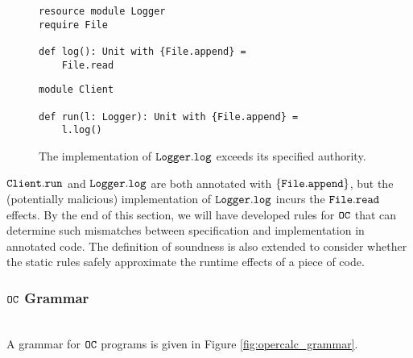 \begin{figure}[h]
\vspace{-5pt}

\begin{lstlisting}
resource module Logger
require File

def log(): Unit with {File.append} =
    File.read
\end{lstlisting}

\begin{lstlisting}
module Client

def run(l: Logger): Unit with {File.append} =
    l.log()
\end{lstlisting}

\vspace{-7pt}
\caption{The implementation of $\mathtt{Logger.log}$ exceeds its specified authority.}
\label{fig:opercalc_motivating}
\end{figure}

$\mathtt{Client.run}$ and $\mathtt{Logger.log}$ are both annotated with $\{ \mathtt{File.append} \}$, but the (potentially malicious) implementation of $\mathtt{Logger.log}$ incurs the $\mathtt{File.read}$ effects. By the end of this section, we will have developed rules for $\mathtt{OC}$ that can determine such mismatches between specification and implementation in annotated code. The definition of soundness is also extended to consider whether the static rules safely approximate the runtime effects of a piece of code.

\subsubsection{$\mathtt{OC}$ Grammar}~\\

A grammar for $\mathtt{OC}$ programs is given in Figure \ref{fig:opercalc_grammar}.

